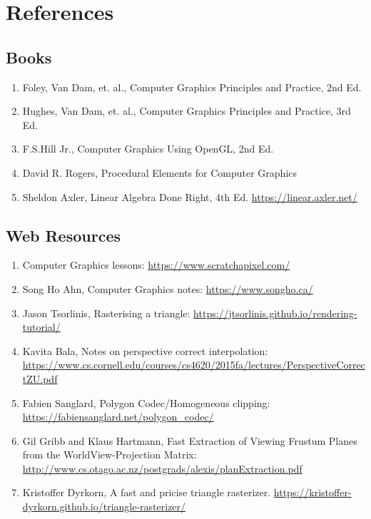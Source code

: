 \chapter{References}
\section{Books}
\begin{enumerate}
    \item Foley, Van Dam, et. al., Computer Graphics Principles and Practice, 2nd Ed. 
    \item Hughes, Van Dam, et. al., Computer Graphics Principles and Practice, 3rd Ed. 
    \item F.S.Hill Jr., Computer Graphics Using OpenGL, 2nd Ed.
    \item David R. Rogers, Procedural Elements for Computer Graphics
	\item Sheldon Axler, Linear Algebra Done Right, 4th Ed. \url{https://linear.axler.net/}
\end{enumerate}

\section{Web Resources}
\begin{enumerate}
    \item Computer Graphics lessons: \url{https://www.scratchapixel.com/}
    \item Song Ho Ahn, Computer Graphics notes:  \url{https://www.songho.ca/}
     \item Jason Tsorlinis, Rasterising a triangle: \url{https://jtsorlinis.github.io/rendering-tutorial/}
     \item Kavita Bala, Notes on perspective correct interpolation: \url{https://www.cs.cornell.edu/courses/cs4620/2015fa/lectures/PerspectiveCorrectZU.pdf}
     \item Fabien Sanglard, Polygon Codec/Homogeneous clipping:  \url{https://fabiensanglard.net/polygon_codec/}
	 \item Gil Gribb and Klaus Hartmann, Fast Extraction of Viewing Frustum Planes from the WorldView-Projection Matrix: \url{http://www.cs.otago.ac.nz/postgrads/alexis/planExtraction.pdf}
	 \item Kristoffer Dyrkorn, A fast and pricise triangle rasterizer. \url{https://kristoffer-dyrkorn.github.io/triangle-rasterizer/}
\end{enumerate}


